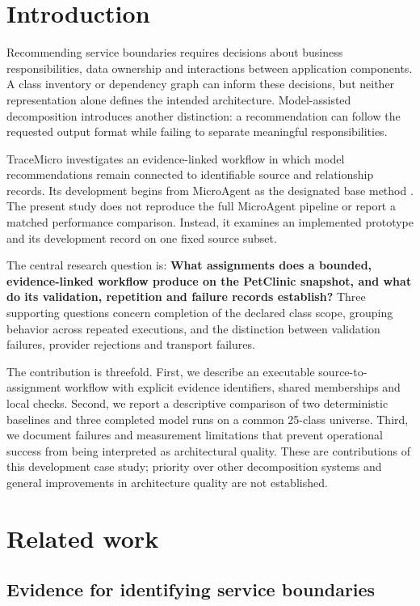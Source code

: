 \section{Introduction}

Recommending service boundaries requires decisions about business responsibilities, data ownership and interactions between application components. A class inventory or dependency graph can inform these decisions, but neither representation alone defines the intended architecture. Model-assisted decomposition introduces another distinction: a recommendation can follow the requested output format while failing to separate meaningful responsibilities.

TraceMicro investigates an evidence-linked workflow in which model recommendations remain connected to identifiable source and relationship records. Its development begins from MicroAgent as the designated base method \cite{su2026}. The present study does not reproduce the full MicroAgent pipeline or report a matched performance comparison. Instead, it examines an implemented prototype and its development record on one fixed source subset.

The central research question is: \textbf{What assignments does a bounded, evidence-linked workflow produce on the PetClinic snapshot, and what do its validation, repetition and failure records establish?} Three supporting questions concern completion of the declared class scope, grouping behavior across repeated executions, and the distinction between validation failures, provider rejections and transport failures.

The contribution is threefold. First, we describe an executable source-to-assignment workflow with explicit evidence identifiers, shared memberships and local checks. Second, we report a descriptive comparison of two deterministic baselines and three completed model runs on a common 25-class universe. Third, we document failures and measurement limitations that prevent operational success from being interpreted as architectural quality. These are contributions of this development case study; priority over other decomposition systems and general improvements in architecture quality are not established.

\section{Related work}

\subsection{Evidence for identifying service boundaries}

